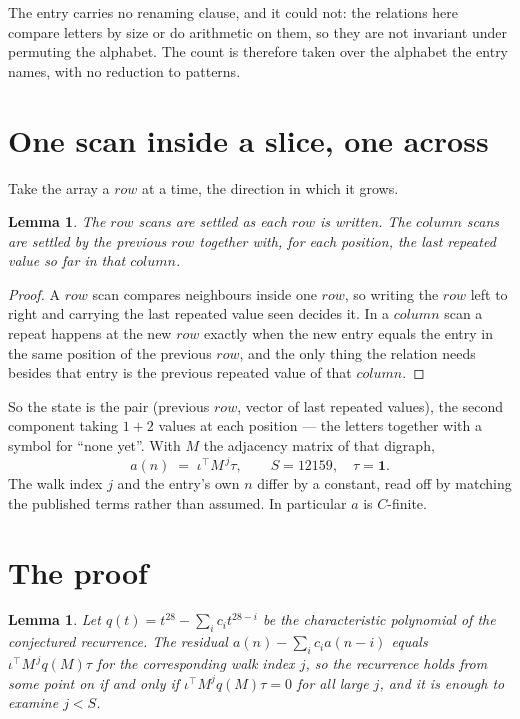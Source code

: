 \documentclass[11pt,a4paper]{article}
\theoremstyle{plain}
\newtheorem{lemma}[theorem]{Lemma}
\theoremstyle{definition}
\begin{document}
The entry carries no renaming clause, and it could not: the relations here compare letters by
size or do arithmetic on them, so they are not invariant under permuting the alphabet. The
count is therefore taken over the alphabet the entry names, with no reduction to patterns.

\section{One scan inside a slice, one across}

Take the array a $row$ at a time, the direction in which it grows.

\begin{lemma}\label{lem:state}
The $row$ scans are settled as each $row$ is written. The $column$ scans are
settled by the previous $row$ together with, for each position, the last repeated value
so far in that $column$.
\end{lemma}

\begin{proof}
A $row$ scan compares neighbours inside one $row$, so writing the
$row$ left to right and carrying the last repeated value seen decides it. In a
$column$ scan a repeat happens at the new $row$ exactly when the new entry equals the
entry in the same position of the previous $row$, and the only thing the relation needs
besides that entry is the previous repeated value of that $column$.
\end{proof}

So the state is the pair (previous $row$, vector of last repeated values), the second
component taking $1+2$ values at each position --- the letters together with a symbol for
``none yet''. With $M$ the adjacency matrix of that digraph,
\[
a(n)\;=\;\iota^{\!\top}M^{\,j}\tau ,\qquad S=12159,\quad\tau=\mathbf{1} .
\]
The walk index $j$ and the entry's own $n$ differ by a constant, read off by matching the
published terms rather than assumed. In particular $a$ is $C$-finite.

\section{The proof}

\begin{lemma}\label{lem:crit}
Let $q(t)=t^{28}-\sum_i c_it^{28-i}$ be the characteristic polynomial of the
conjectured recurrence. The residual $a(n)-\sum_ic_ia(n-i)$ equals
$\iota^{\!\top}M^{\,j}q(M)\tau$ for the corresponding walk index $j$, so the recurrence
holds from some point on if and only if $\iota^{\!\top}M^{j}q(M)\tau=0$ for all large $j$,
and it is enough to examine $j<S$.
\end{lemma}
\end{document}
